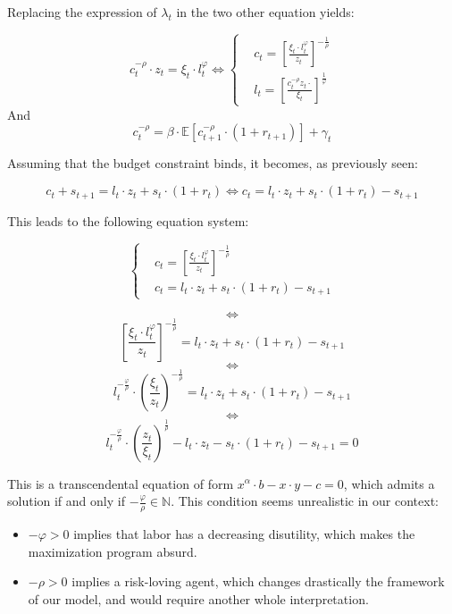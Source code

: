 \documentclass{article}
\begin{document}
Replacing the expression of $\lambda_{t}$ in the two other equation yields: 

\begin{equation}
    c^{-\rho}_{t}\cdot z_{t} = \xi_{t}\cdot l_{t}^{\varphi} \iff
        \begin{cases}
        & c_t = \left[\frac{\xi_{t}\cdot l_{t}^{\varphi}}{z_{t}}\right]^{-\frac{1}{\rho}}\\ 
        & l_{t} = \left[\frac{c_{t}^{-\rho}z_{t}\cdot}{\xi_{t}}\right]^{\frac{1}{\varphi}}
    \end{cases}
\end{equation}
And 
\begin{equation}
    c^{-\rho}_{t} = \beta \cdot \mathbb{E}\left[c^{-\rho}_{t+1}\cdot (1+r_{t+1})\right] + \gamma_{t}
\end{equation}

Assuming that the budget constraint binds, it becomes, as previously seen:

$$c_{t} + s_{t+1} = l_{t}\cdot z_{t} + s_{t}\cdot(1+r_{t})
\iff 
c_{t} = l_{t}\cdot z_{t} + s_{t}\cdot(1+r_{t}) - s_{t+1} 
$$

This leads to the following equation system: 

$$
\begin{cases}
    & c_t = \left[\frac{\xi_{t}\cdot l_{t}^{\varphi}}{z_{t}}\right]^{-\frac{1}{\rho}} \\
    & c_{t} = l_{t}\cdot z_{t} + s_{t}\cdot(1+r_{t}) - s_{t+1} 
\end{cases}
$$

$$\iff$$
$$ \left[\frac{\xi_{t}\cdot l_{t}^{\varphi}}{z_{t}}\right]^{-\frac{1}{\rho}} = l_{t}\cdot z_{t} + s_{t}\cdot(1+r_{t}) - s_{t+1} $$
$$\iff$$
$$ l_{t}^{-\frac{\varphi}{\rho}} \cdot \left(\frac{\xi_{t}}{z_{t}}\right)^{-\frac{1}{\rho}} = l_{t}\cdot z_{t} + s_{t}\cdot(1+r_{t}) - s_{t+1} $$
$$\iff$$
$$ l_{t}^{-\frac{\varphi}{\rho}} \cdot \left(\frac{z_{t}}{\xi_{t}}\right)^{\frac{1}{\rho}} - l_{t}\cdot z_{t} - s_{t}\cdot(1+r_{t}) - s_{t+1} = 0 $$

This is a transcendental equation of form 
$x^{\alpha}\cdot b - x\cdot y - c = 0$,
which admits a solution if and only if $-\frac{\varphi}{\rho} \in \mathbb{N}$.
This condition seems unrealistic in our context: 

\begin{itemize}
    \item $-\varphi >0$ implies that labor has a decreasing disutility,
    which makes the maximization program absurd.
    \item $-\rho >0$ implies a risk-loving agent, which changes 
    drastically the framework of our model, and would require another whole 
    interpretation.
\end{itemize}
\end{document}
